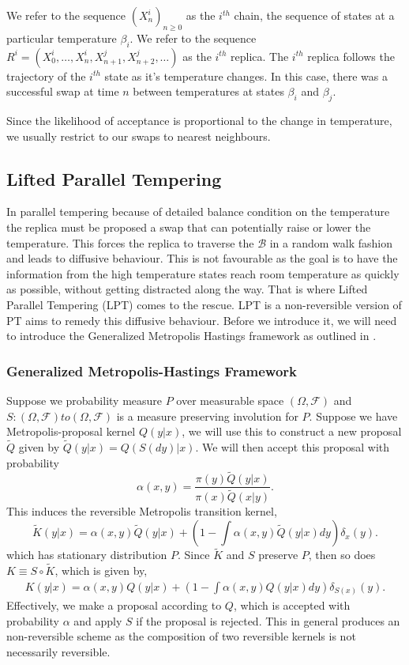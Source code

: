 \documentclass[12pt]{article}
\begin{document}
We refer to the sequence $(X_n^{i})_{n\geq0}$ as the $i^{th}$ chain, the sequence of states at a particular temperature $\beta_i$. We refer to the sequence $R^i=(X_0^{i},\dots,X_n^i,X_{n+1}^{j},X_{n+2}^{j},\dots)$ as the $i^{th}$ replica. The $i^{th}$ replica follows the trajectory of the $i^{th}$ state as it's temperature changes. In this case, there was a successful swap at time $n$ between temperatures at states $\beta_i$ and $\beta_j$.  

Since the likelihood of acceptance is proportional to the change in temperature, we usually restrict to our swaps to nearest neighbours. 
\subsection{Lifted Parallel Tempering}
In parallel tempering because of detailed balance condition on the temperature the replica must be proposed a swap that can potentially raise or lower the temperature. This  forces the replica to traverse the $\mathcal{B}$ in a random walk fashion and leads to diffusive behaviour. This is not favourable as the goal is to have the information from the high temperature states reach room temperature as quickly as possible, without getting distracted along the way. That is where Lifted Parallel Tempering (LPT) comes to the rescue. LPT is a non-reversible version of PT aims to remedy this diffusive behaviour. Before we introduce it, we will need to introduce the Generalized Metropolis Hastings framework as outlined in \cite{wu_irreversible_2017}.

\subsubsection{Generalized Metropolis-Hastings Framework}
Suppose we probability measure $P$ over measurable space $(\Omega,\mathcal{F})$ and $S:(\Omega,\mathcal{F})to (\Omega,\mathcal{F})$ is a measure preserving involution for $P$. Suppose we have Metropolis-proposal kernel $Q(y|x)$, we will use this to construct a new proposal $\tilde{Q}$ given by $\tilde{Q}(y|x)=Q(S(dy)|x)$. We will then accept this proposal with probability 
\[\alpha(x,y)=\frac{\pi(y)\tilde{Q}(y|x)}{\pi(x)\tilde{Q}(x|y)}.\]
This induces the reversible Metropolis transition kernel, 
\[\tilde{K}(y|x)=\alpha(x,y)\tilde{Q}(y|x)+\left(1-\int\alpha(x,y)\tilde{Q}(y|x)dy\right)\delta_x(y).\]
which has stationary distribution $P$. Since $\tilde{K}$ and $S$ preserve $P$, then so does $K\equiv S\circ \tilde{K}$, which is given by,
\begin{align*}
K(y|x)=\alpha(x,y)Q(y|x)+\left(1-\int\alpha(x,y)Q(y|x)dy\right)\delta_{S(x)}(y).
\end{align*}
Effectively, we make a proposal according to $Q$, which is accepted with probability $\alpha$ and apply $S$ if the proposal is rejected. This in general produces an non-reversible scheme as the composition of two reversible kernels is not necessarily reversible.
\end{document}
